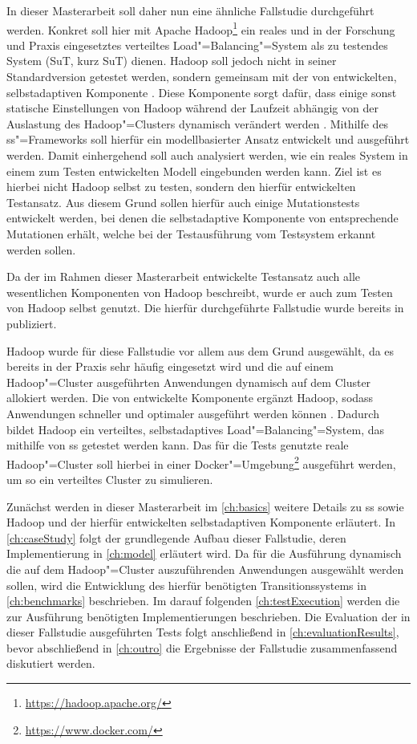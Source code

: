 In dieser Masterarbeit soll daher nun eine ähnliche Fallstudie durchgeführt werden.
Konkret soll hier mit Apache Hadoop\footnote{\url{https://hadoop.apache.org/}} ein reales und in der Forschung und Praxis eingesetztes verteiltes Load"=Balancing"=System \cite{PoweredByHadoop} als zu testendes System (\acrlong{SuT}, kurz \acrshort{SuT}) dienen.
Hadoop soll jedoch nicht in seiner Standardversion getestet werden, sondern gemeinsam mit der von \citeauthor{Zhang2016} entwickelten, selbstadaptiven Komponente \cite{Zhang2016}.
Diese Komponente sorgt dafür, dass einige sonst statische Einstellungen von Hadoop während der Laufzeit abhängig von der Auslastung des Hadoop"=Clusters dynamisch verändert werden \cite{Zhang2016}.
Mithilfe des \gls{ss}"=Frameworks soll hierfür ein modellbasierter Ansatz entwickelt und ausgeführt werden.
Damit einhergehend soll auch analysiert werden, wie ein reales System in einem zum Testen entwickelten Modell eingebunden werden kann.
Ziel ist es hierbei nicht Hadoop selbst zu testen, sondern den hierfür entwickelten Testansatz.
Aus diesem Grund sollen hierfür auch einige Mutationstests entwickelt werden, bei denen die selbstadaptive Komponente von \citeauthor{Zhang2016} entsprechende Mutationen erhält, welche bei der Testausführung vom Testsystem erkannt werden sollen.

Da der im Rahmen dieser Masterarbeit entwickelte Testansatz auch alle wesentlichen Komponenten von Hadoop beschreibt, wurde er auch zum Testen von Hadoop selbst genutzt.
Die hierfür durchgeführte Fallstudie wurde bereits in \cite{Eberhardinger2018} publiziert.

Hadoop wurde für diese Fallstudie vor allem aus dem Grund ausgewählt, da es bereits in der Praxis sehr häufig eingesetzt wird \cite{PoweredByHadoop} und die auf einem Hadoop"=Cluster ausgeführten Anwendungen dynamisch auf dem Cluster allokiert werden.
Die von \citeauthor{Zhang2016} entwickelte Komponente ergänzt Hadoop, sodass Anwendungen schneller und optimaler ausgeführt werden können \cite{Zhang2016}.
Dadurch bildet Hadoop ein verteiltes, selbstadaptives Load"=Balancing"=System, das mithilfe von \gls{ss} getestet werden kann.
Das für die Tests genutzte reale Hadoop"=Cluster soll hierbei in einer Docker"=Umgebung\footnote{\url{https://www.docker.com/}} ausgeführt werden, um so ein verteiltes Cluster zu simulieren.

Zunächst werden in dieser Masterarbeit im \cref{ch:basics} weitere Details zu \gls{ss} sowie Hadoop und der hierfür entwickelten selbstadaptiven Komponente erläutert.
In \cref{ch:caseStudy} folgt der grundlegende Aufbau dieser Fallstudie, deren Implementierung in \cref{ch:model} erläutert wird.
Da für die Ausführung dynamisch die auf dem Hadoop"=Cluster auszuführenden Anwendungen ausgewählt werden sollen, wird die Entwicklung des hierfür benötigten Transitionssystems in \cref{ch:benchmarks} beschrieben.
Im darauf folgenden \cref{ch:testExecution} werden die zur Ausführung benötigten Implementierungen beschrieben.
Die Evaluation der in dieser Fallstudie ausgeführten Tests folgt anschließend in \cref{ch:evaluationResults}, bevor abschließend in \cref{ch:outro} die Ergebnisse der Fallstudie zusammenfassend diskutiert werden.
